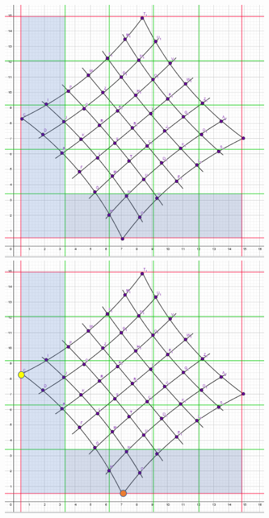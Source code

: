 \begin{figure}[!htb]
	\includegraphics[width=\linewidth]{images/VerzeichnetesSchachbrett_0.png}
	\caption{}
	\label{fig:awesome_image1}
	\endminipage\hfill
	\includegraphics[width=\linewidth]{images/VerzeichnetesSchachbrett_1.png}
	\caption{}
	\label{fig:awesome_image2}
	\endminipage\hfill
\end{figure}

